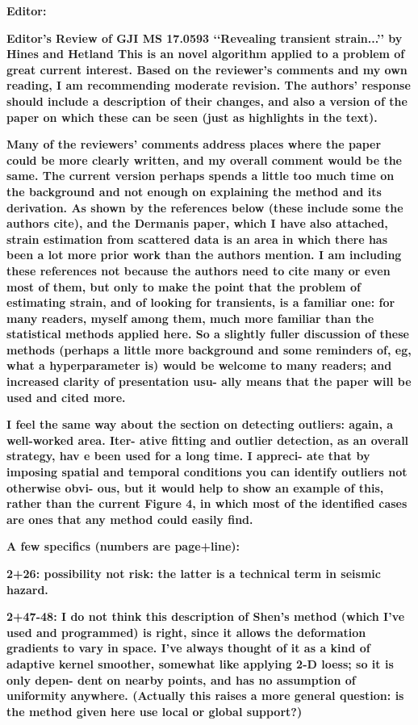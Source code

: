 \documentclass[10pt,a4paper]{letter}
\begin{document}
\begin{letter}{}

\textbf{Editor:}\newline

\textbf{Editor’s Review of GJI MS 17.0593 ‘‘Revealing transient strain...’’ by
Hines and Hetland This is an novel algorithm applied to a problem of
great current interest. Based on the reviewer’s comments and my own
reading, I am recommending moderate revision. The authors’ response
should include a description of their changes, and also a version of
the paper on which these can be seen (just as highlights in the text).}

\textbf{Many of the reviewers’ comments address places where the paper could
be more clearly written, and my overall comment would be the same. The
current version perhaps spends a little too much time on the
background and not enough on explaining the method and its derivation.
As shown by the references below (these include some the authors
cite), and the Dermanis paper, which I have also attached, strain
estimation from scattered data is an area in which there has been a
lot more prior work than the authors mention. I am including these
references not because the authors need to cite many or even most of
them, but only to make the point that the problem of estimating
strain, and of looking for transients, is a familiar one: for many
readers, myself among them, much more familiar than the statistical
methods applied here. So a slightly fuller discussion of these methods
(perhaps a little more background and some reminders of, eg, what a
hyperparameter is) would be welcome to many readers; and increased
clarity of presentation usu- ally means that the paper will be used
and cited more.}

\textbf{I feel the same way about the section on detecting outliers: again, a
well-worked area. Iter- ative fitting and outlier detection, as an
overall strategy, hav e been used for a long time. I appreci- ate that
by imposing spatial and temporal conditions you can identify outliers
not otherwise obvi- ous, but it would help to show an example of this,
rather than the current Figure 4, in which most of the identified
cases are ones that any method could easily find.}

\textbf{A few specifics (numbers are page+line):}

\textbf{2+26: possibility not risk: the latter is a technical term in seismic
hazard.}

\textbf{2+47-48: I do not think this description of Shen’s method (which I’ve
used and programmed) is right, since it allows the deformation
gradients to vary in space. I’ve always thought of it as a kind of
adaptive kernel smoother, somewhat like applying 2-D loess; so it is
only depen- dent on nearby points, and has no assumption of uniformity
anywhere. (Actually this raises a more general question: is the method
given here use local or global support?)}


\end{letter}
\end{document}
